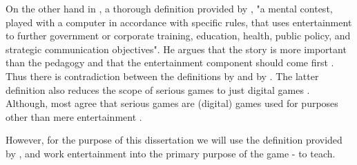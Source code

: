 \documentclass[a4paper,11.5pt]{report}
\numberwithin{figure}{section}
\numberwithin{table}{section}
\numberwithin{equation}{section}
\numberwithin{equation}{section}
\begin{document}
On the other hand in \citeyear{Zyda2005}, a thorough definition provided by \citeauthor{Zyda2005}, "a mental contest, played with a computer in accordance with specific rules, that uses entertainment to further government or corporate training, education, health, public policy, and strategic communication objectives". He argues that the story is more important than the pedagogy and that the entertainment component should come first \citep{Zyda2005}. Thus there is contradiction between the definitions by \citeauthor{Michael2005} and by \citeauthor{Zyda2005}. The latter definition also reduces the scope of serious games to just digital games \citep{Jean}. Although, most agree that serious games are (digital) games used for purposes other than mere entertainment \citep{Johann2015}.


However, for the purpose of this dissertation we will use the definition provided by \citeauthor{abt1970}, and work entertainment into the primary purpose of the game - to teach.






\end{document}
